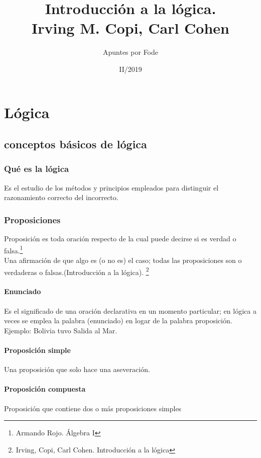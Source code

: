 \documentclass[10pt]{book} 						%
\begin{document}
\normalfont

\author{Apuntes por Fode}
\title{Introducción a la lógica. \\ \vspace{0.5cm} \small Irving M. Copi, Carl Cohen}
\date{II/2019}
\maketitle
\let\cleardoublepage\clearpage
\tableofcontents 								%



\let\cleardoublepage\clearpage
\chapter{Lógica}
\section{conceptos básicos de lógica}
\subsection{Qué es la lógica}
Es el estudio de los métodos y principios empleados para distinguir el razonamiento correcto del incorrecto. 
\subsection{Proposiciones} 
Proposición es toda oración respecto de la cual puede decirse si es verdad o falsa.\footnote{Armando Rojo. Álgebra I}  \\ 
Una afirmación de que algo es (o no es) el caso; todas las proposiciones son o verdaderas o falsas.(Introducción a la lógica). \footnote{Irving, Copi, Carl Cohen. Introducción a la lógica}\\
\subsubsection{Enunciado}
Es el significado de una oración declarativa en un momento particular; en lógica a veces se emplea la palabra (enunciado) en logar de la palabra proposición.\\
Ejemplo: Bolivia tuvo Salida al Mar. 
\subsubsection{Proposición simple}
Una proposición que solo hace una aseveración.
\subsubsection{Proposición compuesta}
Proposición que contiene dos o más proposiciones simples
\end{document}
